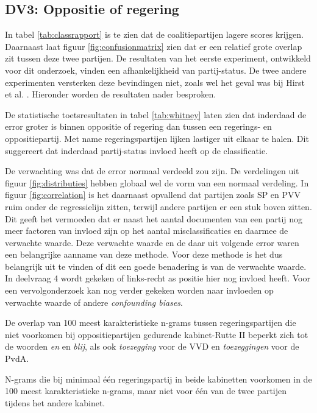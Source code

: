 \subsection{DV3: Oppositie of regering}
In tabel \ref{tab:classrapport} is te zien dat de coalitiepartijen lagere scores krijgen. Daarnaast laat figuur \ref{fig:confusionmatrix} zien dat er een relatief grote overlap zit tussen deze twee partijen. De resultaten van het eerste experiment, ontwikkeld voor dit onderzoek, vinden een afhankelijkheid van partij-status. De twee andere experimenten versterken deze bevindingen niet, zoals wel het geval was bij Hirst et al. \cite{Hirst_textto}. Hieronder worden de resultaten nader besproken.\par
De statistische toetsresultaten in tabel \ref{tab:whitney} laten zien dat inderdaad de error groter is binnen oppositie of regering dan tussen een regerings- en oppositiepartij. Met name regeringspartijen lijken lastiger uit elkaar te halen. Dit suggereert dat inderdaad partij-status invloed heeft op de classificatie. \par
De verwachting was dat de error normaal verdeeld zou zijn. De verdelingen uit figuur \ref{fig:distributies} hebben globaal wel de vorm van een normaal verdeling. In figuur \ref{fig:correlation} is het daarnaast opvallend dat partijen zoals SP en PVV ruim onder de regressielijn zitten, terwijl andere partijen er een stuk boven zitten. Dit geeft het vermoeden dat er naast het aantal documenten van een partij nog meer factoren van invloed zijn op het aantal misclassificaties en daarmee de verwachte waarde. Deze verwachte waarde en de daar uit volgende error waren een belangrijke aanname van deze methode. Voor deze methode is het dus belangrijk uit te vinden of dit een goede benadering is van de verwachte waarde. In deelvraag 4 wordt gekeken of links-recht as positie hier nog invloed heeft. Voor een vervolgonderzoek kan nog verder gekeken worden naar invloeden op verwachte waarde of andere \textit{confounding biases}.\par
De overlap van 100 meest karakteristieke n-grams tussen regeringspartijen die niet voorkomen bij oppositiepartijen gedurende kabinet-Rutte II beperkt zich tot de woorden \textit{en} en \textit{blij}, als ook \textit{toezegging} voor de VVD en \textit{toezeggingen} voor de PvdA.\par
\begin{table}[H]
\label{tab:overlapkabinetten}
\caption{N-grams die bij minimaal één regeringspartij in beide kabinetten voorkomen in de 100 meest karakteristieke n-grams, maar niet voor één van de twee partijen tijdens het andere kabinet.}
\centering
 
\end{table}
